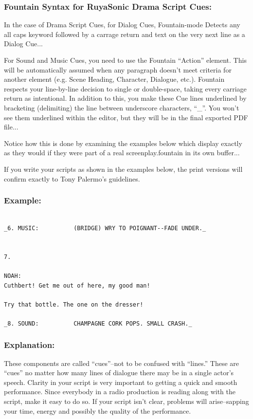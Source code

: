 \documentclass[openleft,oneside,showtrims]{memoir}
\begin{document}
\subsubsection*{Fountain Syntax for RuyaSonic Drama Script Cues:}
\label{sec:orgb95e93e}

In the case of Drama Script Cues, for Dialog Cues, Fountain-mode Detects any all caps keyword followed by a carrage return and text on the very next line as a Dialog Cue...

For Sound and Music Cues, you need to use the Fountain ``Action'' element.  This will be automatically assumed when any paragraph doesn't meet criteria for another element (e.g. Scene Heading, Character, Dialogue, etc.). Fountain respects your line-by-line decision to single or double-space, taking every carriage return as intentional. In addition to this, you make these Cue lines underlined by bracketing (delimiting) the line between underscore characters, ``\_''.  You won't see them underlined within the editor, but they will be in the final exported PDF file...

Notice how this is done by examining the examples below which display exactly as they would if they were part of a real screenplay.fountain in its own buffer...

If you write your scripts as shown in the examples below, the print versions will confirm exactly to Tony Palermo's guidelines.

\subsubsection*{Example:}
\label{sec:org3c748ca}
\lstset{language=fountain,label= ,caption= ,captionpos=b,numbers=none}
\begin{lstlisting}

_6. MUSIC:          (BRIDGE) WRY TO POIGNANT--FADE UNDER._


7.

NOAH:
Cuthbert! Get me out of here, my good man!
  
Try that bottle. The one on the dresser!

_8. SOUND:          CHAMPAGNE CORK POPS. SMALL CRASH._

\end{lstlisting}
\subsubsection*{Explanation:  }
\label{sec:org436ad71}

These components are called ``cues''--not to be confused with ``lines.'' These are ``cues'' no matter how many lines of dialogue there may be in a single actor's speech. Clarity in your script is very important to getting a quick and smooth performance. Since everybody in a radio production is reading along with the script, make it easy to do so. If your script isn't clear, problems will arise--sapping your time, energy and possibly the quality of the performance.
\end{document}

